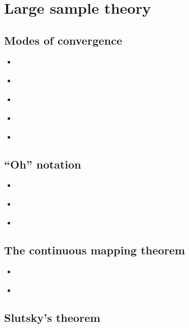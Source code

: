 \documentclass{report}
\begin{document}
\section{Large sample theory}\label{sec:reading-lst}

\subsection{Modes of convergence}

\begin{itemize}
    \item \cite[Chapter~2.1]{van_der_vaart_asymptotic_1998}
    \item \cite[Chapter~1.1]{dasgupta_asymptotic_2008}
    \item \cite[Chapter 5.5]{casella_statistical_2002}
    \item \cite[Chapter~2]{lehmann_elements_1999}
    \item \cite[Chapter~1.2-6]{serfling_approximation_1980}
\end{itemize}

\subsection{``Oh'' notation}

\begin{itemize}
    \item \cite[Chapter~2.2]{van_der_vaart_asymptotic_1998}
    \item \cite[Chapter~1.4]{lehmann_elements_1999}
    \item \cite[Chapter~1.1]{serfling_approximation_1980}
\end{itemize}

\subsection{The continuous mapping theorem}

\begin{itemize}
    \item \cite[Chapter~2.1]{van_der_vaart_asymptotic_1998}
    \item \cite[Chapter~1.3]{dasgupta_asymptotic_2008}
\end{itemize}

\subsection{Slutsky's theorem}
\end{document}
